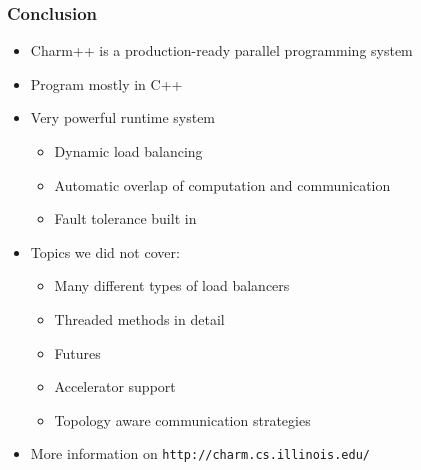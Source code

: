 \begin{frame}[fragile]
\frametitle{Conclusion}
\begin{itemize}
  \item Charm++ is a production-ready parallel programming system
  \item Program mostly in C++
  \item Very powerful runtime system
    \begin{itemize}
    \item Dynamic load balancing
    \item Automatic overlap of computation and communication
    \item Fault tolerance built in
    \end{itemize}
  \item Topics we did not cover:
    \begin{itemize}
    \item Many different types of load balancers
    \item Threaded methods in detail
    \item Futures
    \item Accelerator support
    \item Topology aware communication strategies
    \end{itemize}
  \item More information on \texttt{http://charm.cs.illinois.edu/}
\end{itemize}
\end{frame}
 
